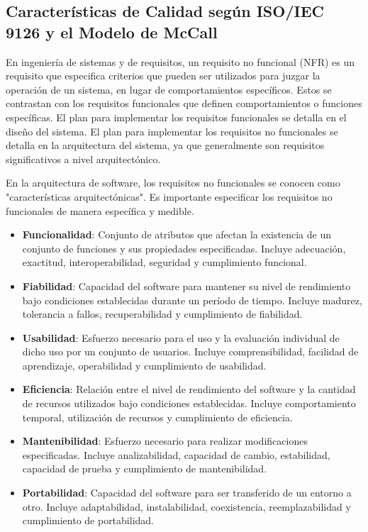 \subsection{Características de Calidad según ISO/IEC 9126 y el Modelo de McCall}

En ingeniería de sistemas y de requisitos, un requisito no funcional (NFR) es un requisito que especifica criterios que pueden ser utilizados para juzgar la operación de un sistema, en lugar de comportamientos específicos. Estos se contrastan con los requisitos funcionales que definen comportamientos o funciones específicas. El plan para implementar los requisitos funcionales se detalla en el diseño del sistema. El plan para implementar los requisitos no funcionales se detalla en la arquitectura del sistema, ya que generalmente son requisitos significativos a nivel arquitectónico.

En la arquitectura de software, los requisitos no funcionales se conocen como "características arquitectónicas". Es importante especificar los requisitos no funcionales de manera específica y medible.

\begin{itemize}
    \item \textbf{Funcionalidad}: Conjunto de atributos que afectan la existencia de un conjunto de funciones y sus propiedades especificadas. Incluye adecuación, exactitud, interoperabilidad, seguridad y cumplimiento funcional.
    \item \textbf{Fiabilidad}: Capacidad del software para mantener su nivel de rendimiento bajo condiciones establecidas durante un período de tiempo. Incluye madurez, tolerancia a fallos, recuperabilidad y cumplimiento de fiabilidad.
    \item \textbf{Usabilidad}: Esfuerzo necesario para el uso y la evaluación individual de dicho uso por un conjunto de usuarios. Incluye comprensibilidad, facilidad de aprendizaje, operabilidad y cumplimiento de usabilidad.
    \item \textbf{Eficiencia}: Relación entre el nivel de rendimiento del software y la cantidad de recursos utilizados bajo condiciones establecidas. Incluye comportamiento temporal, utilización de recursos y cumplimiento de eficiencia.
    \item \textbf{Mantenibilidad}: Esfuerzo necesario para realizar modificaciones especificadas. Incluye analizabilidad, capacidad de cambio, estabilidad, capacidad de prueba y cumplimiento de mantenibilidad.
    \item \textbf{Portabilidad}: Capacidad del software para ser transferido de un entorno a otro. Incluye adaptabilidad, instalabilidad, coexistencia, reemplazabilidad y cumplimiento de portabilidad.
\end{itemize}

